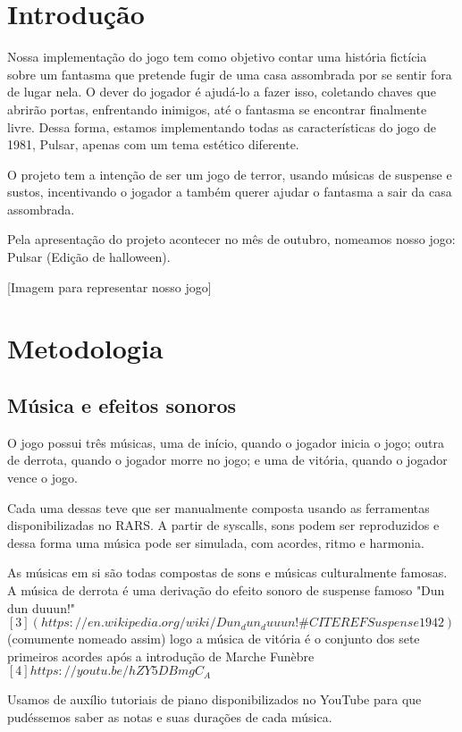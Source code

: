 \documentclass[conference]{IEEEtran}
\begin{document}
\section{Introdução}
Nossa implementação do jogo tem como objetivo contar uma história fictícia sobre um fantasma que pretende fugir de uma casa assombrada por se sentir fora de lugar nela. O dever do jogador é ajudá-lo a fazer isso, coletando chaves que abrirão portas, enfrentando inimigos, até o fantasma se encontrar finalmente livre. Dessa forma, estamos implementando todas as características do jogo de 1981, Pulsar, apenas com um tema estético diferente. 

O projeto tem a intenção de ser um jogo de terror, usando músicas de suspense e sustos, incentivando o jogador a também querer ajudar o fantasma a sair da casa assombrada.

Pela apresentação do projeto acontecer no mês de outubro, nomeamos nosso jogo: Pulsar (Edição de halloween).

[Imagem para representar nosso jogo]

\section{Metodologia}

\subsection{Música e efeitos sonoros}

O jogo possui três músicas, uma de início, quando o jogador inicia o jogo; outra de derrota, quando o jogador morre no jogo; e uma de vitória, quando o jogador vence o jogo.

Cada uma dessas teve que ser manualmente composta usando as ferramentas disponibilizadas no RARS. A partir de syscalls, sons podem ser reproduzidos e dessa forma uma música pode ser simulada, com acordes, ritmo e harmonia.

As músicas em si são todas compostas de sons e músicas culturalmente famosas. A música de derrota é uma derivação do efeito sonoro de suspense famoso "Dun dun duuun!"$[3](https://en.wikipedia.org/wiki/Dun_dun_duuun!\#CITEREFSuspense1942)$ (comumente nomeado assim)
logo a música de vitória é o conjunto dos sete primeiros acordes após a introdução de Marche Funèbre$[4]https://youtu.be/hZY5DBmgC_A$  

Usamos de auxílio tutoriais de piano disponibilizados no YouTube para que pudéssemos saber as notas e suas durações de cada música.
\end{document}
